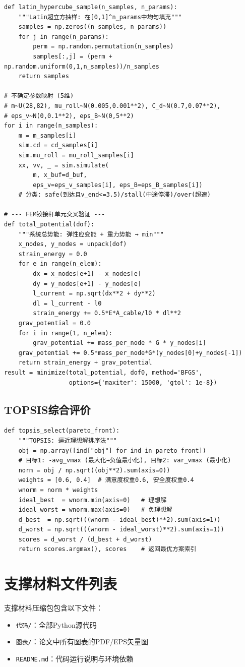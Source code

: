 \documentclass[12pt,a4paper]{ctexart}
\begin{document}
{\small
\begin{lstlisting}
def latin_hypercube_sample(n_samples, n_params):
    """Latin超立方抽样: 在[0,1]^n_params中均匀填充"""
    samples = np.zeros((n_samples, n_params))
    for j in range(n_params):
        perm = np.random.permutation(n_samples)
        samples[:,j] = (perm + np.random.uniform(0,1,n_samples))/n_samples
    return samples

# 不确定参数映射 (5维)
# m~U(28,82), mu_roll~N(0.005,0.001**2), C_d~N(0.7,0.07**2),
# eps_v~N(0,0.1**2), eps_B~N(0,5**2)
for i in range(n_samples):
    m = m_samples[i]
    sim.cd = cd_samples[i]
    sim.mu_roll = mu_roll_samples[i]
    xx, vv, _ = sim.simulate(
        m, x_buf=d_buf,
        eps_v=eps_v_samples[i], eps_B=eps_B_samples[i])
    # 分类: safe(到达且v_end<=3.5)/stall(中途停滞)/over(超速)

# --- FEM铰接杆单元交叉验证 ---
def total_potential(dof):
    """系统总势能: 弹性应变能 + 重力势能 → min"""
    x_nodes, y_nodes = unpack(dof)
    strain_energy = 0.0
    for e in range(n_elem):
        dx = x_nodes[e+1] - x_nodes[e]
        dy = y_nodes[e+1] - y_nodes[e]
        l_current = np.sqrt(dx**2 + dy**2)
        dl = l_current - l0
        strain_energy += 0.5*E*A_cable/l0 * dl**2
    grav_potential = 0.0
    for i in range(1, n_elem):
        grav_potential += mass_per_node * G * y_nodes[i]
    grav_potential += 0.5*mass_per_node*G*(y_nodes[0]+y_nodes[-1])
    return strain_energy + grav_potential
result = minimize(total_potential, dof0, method='BFGS',
                  options={'maxiter': 15000, 'gtol': 1e-8})
\end{lstlisting}
}

\subsection{TOPSIS综合评价}

{\small
\begin{lstlisting}
def topsis_select(pareto_front):
    """TOPSIS: 逼近理想解排序法"""
    obj = np.array([ind["obj"] for ind in pareto_front])
    # 目标1: -avg_vmax (最大化→负值最小化), 目标2: var_vmax (最小化)
    norm = obj / np.sqrt((obj**2).sum(axis=0))
    weights = [0.6, 0.4]  # 满意度权重0.6, 安全度权重0.4
    wnorm = norm * weights
    ideal_best  = wnorm.min(axis=0)   # 理想解
    ideal_worst = wnorm.max(axis=0)   # 负理想解
    d_best  = np.sqrt(((wnorm - ideal_best)**2).sum(axis=1))
    d_worst = np.sqrt(((wnorm - ideal_worst)**2).sum(axis=1))
    scores = d_worst / (d_best + d_worst)
    return scores.argmax(), scores    # 返回最优方案索引
\end{lstlisting}
}

\section{支撑材料文件列表}

支撑材料压缩包包含以下文件：

\begin{itemize}
  \item \texttt{代码/}：全部Python源代码
  \item \texttt{图表/}：论文中所有图表的PDF/EPS矢量图
  \item \texttt{README.md}：代码运行说明与环境依赖
\end{itemize}
\end{document}
